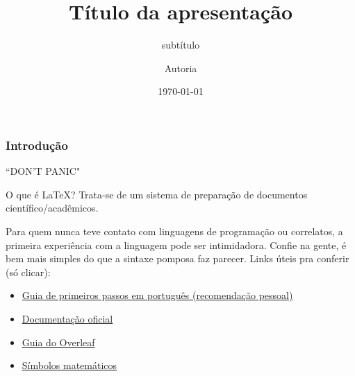 \documentclass[aspectratio=169]{beamer} %
\title{Título da apresentação}
\subtitle{subtítulo}
\author{Autoria}
\date{\today}
\begin{document}
\frame{\titlepage}


\begin{frame}

    \frametitle{Introdução}

    \begin{center}
        ``DON'T PANIC"
       \textit{\cite{adams}}
    \end{center}

    \begin{block}{\centering O que é \LaTeX?}
        \centering
        Trata-se de um sistema de preparação de documentos científico/acadêmicos.

    \end{block}

    Para quem nunca teve contato com linguagens de programação ou correlatos, a
    primeira experiência com a linguagem pode ser intimidadora. Confie na gente, é
    bem mais simples do que a sintaxe pomposa faz parecer. Links úteis pra conferir
    (só clicar):
    \vspace{6pt}

    \begin{itemize}

        \item \href{https://learnxinyminutes.com/pt-br/latex/}{Guia de primeiros
            passos em português (recomendação pessoal)}

        \item \href{https://www.latex-project.org/help/documentation/\#general-documentation}{Documentação
            oficial}

        \item \href{https://www.overleaf.com/learn/latex/Learn\_LaTeX\_in\_30\_minutes}{Guia
            do Overleaf}

        \item \href{https://typst.app/docs/reference/symbols/sym/}{Símbolos
            matemáticos}

    \end{itemize}


\end{frame}
\end{document}
